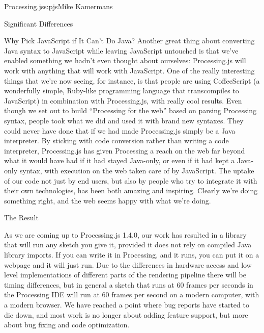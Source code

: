 \begin{aosachapter}{Processing.js}{s:pjs}{Mike Kamermans}
\begin{aosasect1}{Significant Differences}
\begin{aosasect2}{Why Pick JavaScript if It Can't Do Java?}
Another great thing about converting Java syntax to JavaScript while
leaving JavaScript untouched is that we've enabled something we
hadn't even thought about ourselves: Processing.js will work with
anything that will work with JavaScript. One of the really interesting
things that we're now seeing, for instance, is that people are using
CoffeeScript (a wonderfully simple, Ruby-like programming language
that transcompiles to JavaScript) in combination with Processing.js,
with really cool results. Even though we set out to build ``Processing
for the web'' based on parsing Processing syntax, people took what we
did and used it with brand new syntaxes. They could never have done
that if we had made Processing.js simply be a Java interpreter. By
sticking with code conversion rather than writing a code interpreter,
Processing.js has given Processing a reach on the web far beyond what
it would have had if it had stayed Java-only, or even if it had kept a
Java-only syntax, with execution on the web taken care of by
JavaScript. The uptake of our code not just by end users, but also by
people who try to integrate it with their own technologies, has been
both amazing and inspiring. Clearly we're doing something right, and
the web seems happy with what we're doing.

\end{aosasect2}

\begin{aosasect2}{The Result}

As we are coming up to Processing.js 1.4.0, our work has resulted in a
library that will run any sketch you give it, provided it does not
rely on compiled Java library imports. If you can write it in
Processing, and it runs, you can put it on a webpage and it will just
run. Due to the differences in hardware access and low level
implementations of different parts of the rendering pipeline there
will be timing differences, but in general a sketch that runs at 60
frames per seconds in the Processing IDE will run at 60 frames per
second on a modern computer, with a modern browser. We have reached a
point where bug reports have started to die down, and most work is no
longer about adding feature support, but more about bug fixing and
code optimization.


\end{aosasect2}
\end{aosasect1}
\end{aosachapter}
